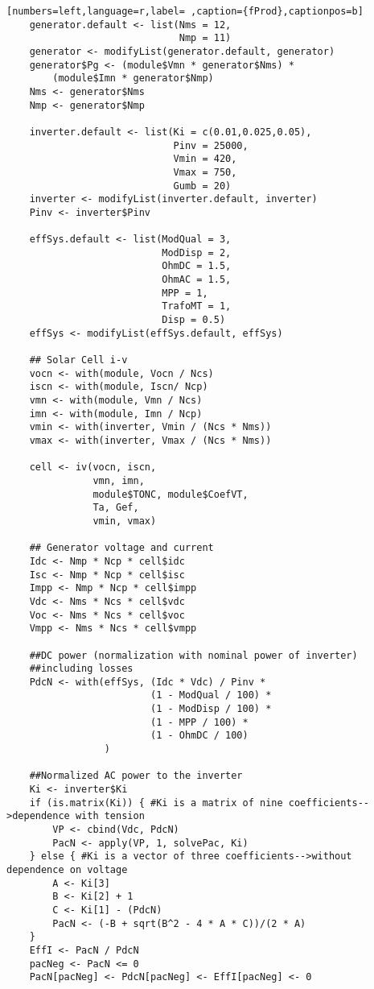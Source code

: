 \begin{lstlisting}[numbers=left,language=r,label= ,caption={fProd},captionpos=b]
    generator.default <- list(Nms = 12,
                              Nmp = 11)
    generator <- modifyList(generator.default, generator)
    generator$Pg <- (module$Vmn * generator$Nms) *
        (module$Imn * generator$Nmp)
    Nms <- generator$Nms
    Nmp <- generator$Nmp

    inverter.default <- list(Ki = c(0.01,0.025,0.05),
                             Pinv = 25000,
                             Vmin = 420,
                             Vmax = 750,
                             Gumb = 20)
    inverter <- modifyList(inverter.default, inverter)
    Pinv <- inverter$Pinv

    effSys.default <- list(ModQual = 3,
                           ModDisp = 2,
                           OhmDC = 1.5,
                           OhmAC = 1.5,
                           MPP = 1,
                           TrafoMT = 1,
                           Disp = 0.5)
    effSys <- modifyList(effSys.default, effSys)

    ## Solar Cell i-v
    vocn <- with(module, Vocn / Ncs)
    iscn <- with(module, Iscn/ Ncp)
    vmn <- with(module, Vmn / Ncs)
    imn <- with(module, Imn / Ncp)
    vmin <- with(inverter, Vmin / (Ncs * Nms))
    vmax <- with(inverter, Vmax / (Ncs * Nms))

    cell <- iv(vocn, iscn,
               vmn, imn,
               module$TONC, module$CoefVT,
               Ta, Gef,
               vmin, vmax)

    ## Generator voltage and current
    Idc <- Nmp * Ncp * cell$idc
    Isc <- Nmp * Ncp * cell$isc
    Impp <- Nmp * Ncp * cell$impp
    Vdc <- Nms * Ncs * cell$vdc
    Voc <- Nms * Ncs * cell$voc
    Vmpp <- Nms * Ncs * cell$vmpp

    ##DC power (normalization with nominal power of inverter)
    ##including losses
    PdcN <- with(effSys, (Idc * Vdc) / Pinv *
                         (1 - ModQual / 100) *
                         (1 - ModDisp / 100) *
                         (1 - MPP / 100) *
                         (1 - OhmDC / 100)
                 ) 

    ##Normalized AC power to the inverter
    Ki <- inverter$Ki
    if (is.matrix(Ki)) { #Ki is a matrix of nine coefficients-->dependence with tension
        VP <- cbind(Vdc, PdcN)
        PacN <- apply(VP, 1, solvePac, Ki)
    } else { #Ki is a vector of three coefficients-->without dependence on voltage
        A <- Ki[3]
        B <- Ki[2] + 1
        C <- Ki[1] - (PdcN)
        PacN <- (-B + sqrt(B^2 - 4 * A * C))/(2 * A)
    }
    EffI <- PacN / PdcN
    pacNeg <- PacN <= 0
    PacN[pacNeg] <- PdcN[pacNeg] <- EffI[pacNeg] <- 0



\end{lstlisting}
